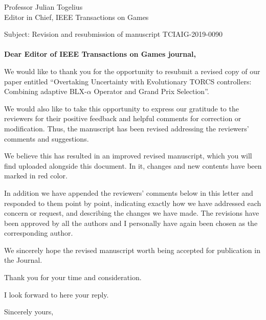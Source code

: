 \documentclass[10pt]{letter} %
\begin{document}

\begin{letter}{Professor Julian Togelius \\ Editor in Chief, IEEE Transactions on Games} %

\opening{Subject: Revision and resubmission of manuscript TCIAIG-2019-0090\\
	\\	
\textbf{Dear Editor of  IEEE Transactions on Games journal,}}


We would like to thank you for the opportunity to resubmit a revised copy of our paper entitled ``Overtaking Uncertainty with Evolutionary TORCS controllers: Combining adaptive BLX-$\alpha$ Operator and Grand Prix Selection''. 

We would also like to take this opportunity to express our gratitude to the reviewers for their positive feedback and helpful comments for correction or modification. Thus, the manuscript has been revised addressing the reviewers' comments and suggestions.

We believe this has resulted in an improved revised manuscript, which you will find uploaded alongside this document. In it, changes and new contents have been marked in red color.

In addition we have appended the reviewers' comments below in this letter and responded to them point by point, indicating exactly how we have addressed each concern or request, and describing the changes we have made. The revisions have been approved by all the authors and I personally have again been chosen as the corresponding author. 

We sincerely hope the revised manuscript worth being accepted for publication in the Journal.

Thank you for your time and consideration.

I look forward to here your reply.

\vspace{2\parskip} %
\closing{Sincerely yours,}
\vspace{2\parskip} %


\end{letter}
\end{document}
